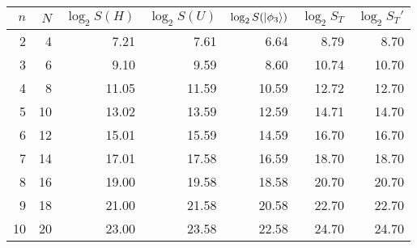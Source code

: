 \begin{tabular}{rrrrrrr}
\toprule
   $n$ &   $N$ &   $\log_2 S(H)$ &   $\log_2 S(U)$ &   $\log_2 S(\ket{\phi_3})$ &   $\log_2 S_T$ &   $\log_2 S_T'$ \\
\midrule
     2 &     4 &            7.21 &            7.61 &                       6.64 &           8.79 &            8.70 \\
     3 &     6 &            9.10 &            9.59 &                       8.60 &          10.74 &           10.70 \\
     4 &     8 &           11.05 &           11.59 &                      10.59 &          12.72 &           12.70 \\
     5 &    10 &           13.02 &           13.59 &                      12.59 &          14.71 &           14.70 \\
     6 &    12 &           15.01 &           15.59 &                      14.59 &          16.70 &           16.70 \\
     7 &    14 &           17.01 &           17.58 &                      16.59 &          18.70 &           18.70 \\
     8 &    16 &           19.00 &           19.58 &                      18.58 &          20.70 &           20.70 \\
     9 &    18 &           21.00 &           21.58 &                      20.58 &          22.70 &           22.70 \\
    10 &    20 &           23.00 &           23.58 &                      22.58 &          24.70 &           24.70 \\
\bottomrule
\end{tabular}